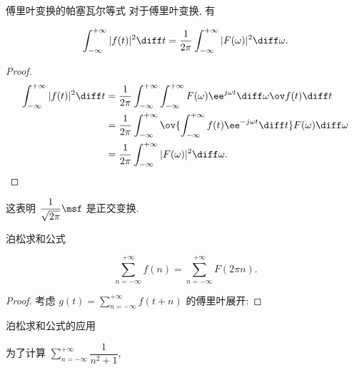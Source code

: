 \begin{frame}{傅里叶变换的帕塞瓦尔等式\noexer}
	\beqskip{5pt}
	\onslide<+->
	对于傅里叶变换, 有
	\begin{theorem}
	\[
		\int_{-\infty}^{+\infty}|f(t)|^2\diff t
		=\frac1{2\pi}\int_{-\infty}^{+\infty}|F(\omega)|^2\diff \omega.
	\]
	\end{theorem}
	\onslide<+->
	\begin{proof}
		\begin{align*}
			\int_{-\infty}^{+\infty}|f(t)|^2\diff t
			&=\dfrac1{2\pi}\int_{-\infty}^{+\infty}\int_{-\infty}^{+\infty}F(\omega)\ee^{j\omega t}\diff \omega \ov f(t)\diff t\\
			&=\dfrac1{2\pi}\int_{-\infty}^{+\infty}\ov{\int_{-\infty}^{+\infty}f(t)\ee^{-j\omega t}\diff t}F(\omega)\diff \omega\\
			&=\frac1{2\pi}\int_{-\infty}^{+\infty}|F(\omega)|^2\diff \omega.\qedhere
		\end{align*}
	\end{proof}
	\onslide<+->
	这表明 $\dfrac1{\sqrt{2\pi}}\msf$ 是正交变换.
	\endgroup
\end{frame}


\begin{frame}{泊松求和公式\noexer}
	\beqskip{0pt}
	\onslide<+->
	\begin{theorem}
	\[
		\sum_{n=-\infty}^{+\infty}f(n)
		=\sum_{n=-\infty}^{+\infty}F(2\pi n).
	\]
	\end{theorem}
	\onslide<+->
	\begin{proof}
		考虑 $g(t)=\sum\limits_{n=-\infty}^{+\infty}f(t+n)$ 的傅里叶展开:
		\onslide<+->{%
		令 $t=0$ 即得.\qedhere
		}
	\end{proof}
	\endgroup
\end{frame}


\begin{frame}{泊松求和公式的应用\noexer}
	\onslide<+->
	\begin{example}
		为了计算 $\sum\limits_{n=-\infty}^{+\infty}\dfrac1{n^2+1}$, 
		\onslide<+->{%
	\[
		f(t)=\msf^{-1}[F(\omega)]=\ee^{-2\pi t\sgn(t)}.
	\]
		}\onslide<+->{%
		于是
	\[
			\sum_{n=-\infty}^{+\infty}\frac1{n^2+1}
			=\pi\sum_{n=-\infty}^{+\infty}F(2\pi n)
			\onslide<+->{=\pi\sum_{n=-\infty}^{+\infty}f(n)
			=\pi\Bigl(1+2\sum_{n=1}^\infty \ee^{-2\pi n}\Bigr)
			=\frac{\pi}{\tanh\pi}.}
	\]
		}
	\end{example}
\end{frame}


